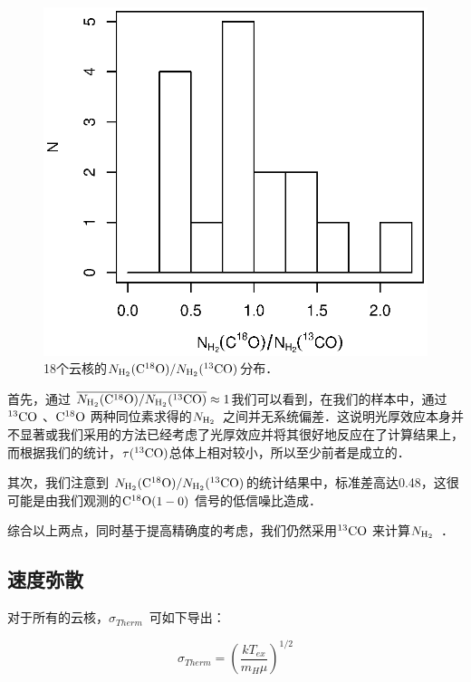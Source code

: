 \documentclass[UTF8, nocolorlinks]{pkuthss}
\newcommand{\cob}{$\rm ^{13}CO$ }
\newcommand{\coc}{$\rm C^{18}O$ }
\newcommand{\cocc}{$\rm C^{18}O(1-0)$ }
\newcommand{\nhyd}{$N_{\rm H_2}$\ }
\newcommand{\sigmath}{$\sigma _{Therm}$\ }
\begin{document}
			\begin{figure}[H]
				\centering
				\includegraphics[totalheight=70mm]{img_plot/1813.eps}
				\caption{18个云核的${N_{\rm H_2}(\rm C^{18}O)}/{ N_{\rm H_2}(\rm ^{13}CO)}$分布．}
				\label{Fig.1813}
			\end{figure}

			首先，通过 $\overline{{N_{\rm H_2}(\rm C^{18}O)}/{N_{\rm H_2}(\rm ^{13}CO)}}\approx 1$我们可以看到，在我们的样本中，通过\cob、\coc 两种同位素求得的\nhyd 之间并无系统偏差．这说明光厚效应本身并不显著或我们采用的方法已经考虑了光厚效应并将其很好地反应在了计算结果上，而根据我们的统计，$\tau(^{13}\rm CO)$总体上相对较小，所以至少前者是成立的．

			其次，我们注意到 ${N_{\rm H_2}(\rm C^{18}O)}/{ N_{\rm H_2}(\rm ^{13}CO)}$的统计结果中，标准差高达0.48，这很可能是由我们观测的\cocc 信号的低信噪比造成．

			综合以上两点，同时基于提高精确度的考虑，我们仍然采用\cob 来计算\nhyd．

		\subsection{速度弥散}\label{Sec.VelocityDispersion}

			对于所有的云核，\sigmath 可如下导出：

      		\begin{equation}
      		   \sigma_{Therm}=\left( \frac{kT_{ex}}{m_H \mu} \right)^{1/2}
      		\end{equation}
\end{document}

